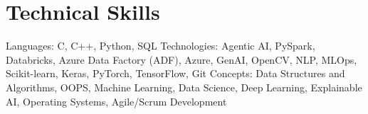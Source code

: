 \section{Technical Skills}
    \begin{itemize}[leftmargin=0.15in, label={}]
	\small{\item{
Languages: C, C++, Python, SQL
Technologies: Agentic AI, PySpark, Databricks, Azure Data Factory (ADF), Azure, GenAI, OpenCV, NLP, MLOps, Scikit-learn, Keras, PyTorch, TensorFlow, Git
Concepts: Data Structures and Algorithms, OOPS, Machine Learning, Data Science, Deep Learning, Explainable AI, Operating Systems, Agile/Scrum Development
	}}
    \end{itemize}